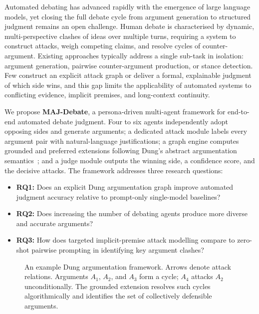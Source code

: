 \documentclass[11pt,twocolumn,letterpaper]{article}
\begin{document}
Automated debating has advanced rapidly with the emergence of large
language models, yet closing the full debate cycle from argument
generation to structured judgment remains an open challenge. Human
debate is characterised by dynamic, multi-perspective clashes of
ideas over multiple turns, requiring a system to construct attacks,
weigh competing claims, and resolve cycles of counter-argument.
Existing approaches typically address a single sub-task in isolation:
argument generation, pairwise counter-argument production, or stance
detection. Few construct an explicit attack graph or deliver a
formal, explainable judgment of which side wins, and this gap limits
the applicability of automated systems to conflicting evidence,
implicit premises, and long-context continuity.

We propose \textbf{MAJ-Debate}, a persona-driven multi-agent
framework for end-to-end automated debate judgment. Four to six
agents independently adopt opposing sides and generate arguments; a
dedicated attack module labels every argument pair with
natural-language justifications; a graph engine computes grounded
and preferred extensions following Dung's abstract argumentation
semantics~\citep{dung1995}; and a judge module outputs the winning
side, a confidence score, and the decisive attacks. The framework
addresses three research questions:

\begin{itemize}
  \item \textbf{RQ1:} Does an explicit Dung argumentation graph
        improve automated judgment accuracy relative to prompt-only
        single-model baselines?
  \item \textbf{RQ2:} Does increasing the number of debating agents
        produce more diverse and accurate arguments?
  \item \textbf{RQ3:} How does targeted implicit-premise attack
        modelling compare to zero-shot pairwise prompting in
        identifying key argument clashes?
\end{itemize}

\begin{figure}[t]
\centering
{}
\caption{An example Dung argumentation framework. Arrows denote
attack relations. Arguments $A_1$, $A_2$, and $A_3$ form a cycle;
$A_4$ attacks $A_2$ unconditionally. The grounded extension resolves
such cycles algorithmically and identifies the set of collectively
defensible arguments.}
\label{fig:arg_graph}
\end{figure}
\end{document}
